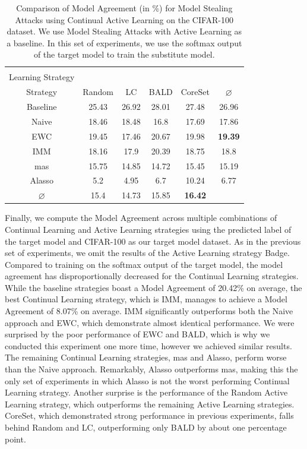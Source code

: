 \begin{table}[h]
    \centering
    \begin{tabular}{c | c c c c | c} 
        \hline
        \diagbox[width=11em]{Active \\ Learning Strategy}{Continual Learning \\ Strategy} & Random & LC & BALD & CoreSet & $\varnothing$\\ 
        \hline 
        Baseline & 25.43 & 26.92 & 28.01 & 27.48 & 26.96 \\
        \hline
        Naive & 18.46 & 18.48 & 16.8 & 17.69 & 17.86\\
        EWC & 19.45 & 17.46 & 20.67 & 19.98 & \textbf{19.39}\\
        IMM & 18.16 & 17.9 & 20.39 & 18.75 & 18.8\\
        \gls{mas} & 15.75 & 14.85 & 14.72 & 15.45 & 15.19\\
        Alasso & 5.2 & 4.95 & 6.7 & 10.24 & 6.77\\
        \hline
        $\varnothing$ & 15.4 & 14.73 & 15.85 & \textbf{16.42}\\
        \hline
    \end{tabular}
    \caption{Comparison of Model Agreement (in \%) for Model Stealing Attacks using Continual Active Learning on the CIFAR-100 dataset. We use Model Stealing Attacks with Active Learning as a baseline. In this set of experiments,
    we use the softmax output of the target model to train the substitute model.}
    \label{fig:ModelStealingCIFAR100Softmax}
\end{table}

Finally, we compute the Model Agreement across multiple combinations of Continual Learning and Active Learning strategies using the predicted label of the target model and CIFAR-100 as our target model dataset. As in the previous set of experiments, we omit the results of
the Active Learning strategy Badge. Compared to training on the softmax output of the target model, the model agreement has disproportionally decreased for the Continual Learning strategies. While the baseline strategies boast a Model Agreement of 20.42\% on average, the
best Continual Learning strategy, which is IMM, manages to achieve a Model Agreement of 8.07\% on average. IMM significantly outperforms both the Naive approach and EWC, which demonstrate almost identical performance. We were surprised by the poor performance of EWC and BALD,
which is why we conducted this experiment one more time, however we achieved similar results. The remaining Continual Learning strategies, \gls{mas} and Alasso, perform worse than the Naive approach. Remarkably, Alasso outperforms \gls{mas}, making this the only set of experiments in which
Alasso is not the worst performing Continual Learning strategy. Another surprise is the performance of the Random Active Learning strategy, which outperforms the remaining Active Learning strategies. CoreSet, which demonstrated strong performance in previous experiments, falls behind
Random and LC, outperforming only BALD by about one percentage point. \par

